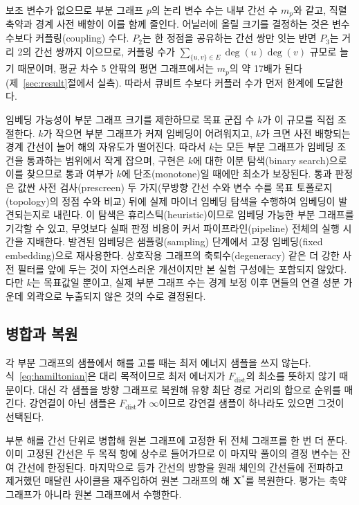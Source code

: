 \documentclass[twocolumn,a4paper]{article}
\begin{document}
보조 변수가 없으므로 부분 그래프 \(p\)의 논리 변수 수는 내부 간선 수 \(m_p\)와 같고, 직렬 축약과 경계 사전 배향이 이를 함께 줄인다. 어닐러에 올릴 크기를 결정하는 것은 변수 수보다 커플링(coupling) 수다. \(P_2\)는 한 정점을 공유하는 간선 쌍만 잇는 반면 \(P_3\)는 거리 2의 간선 쌍까지 이으므로, 커플링 수가 \(\sum_{\{u,v\}\in E}\deg(u)\deg(v)\) 규모로 늘기 때문이며, 평균 차수 5 안팎의 평면 그래프에서는 \(m_p\)의 약 17배가 된다(제~\ref{sec:result}절에서 실측). 따라서 큐비트 수보다 커플러 수가 먼저 한계에 도달한다.

임베딩 가능성이 부분 그래프 크기를 제한하므로 목표 군집 수 \(k\)가 이 규모를 직접 조절한다. \(k\)가 작으면 부분 그래프가 커져 임베딩이 어려워지고, \(k\)가 크면 사전 배향되는 경계 간선이 늘어 해의 자유도가 떨어진다. 따라서 \(k\)는 모든 부분 그래프가 임베딩 조건을 통과하는 범위에서 작게 잡으며, 구현은 \(k\)에 대한 이분 탐색(binary search)으로 이를 찾으므로 통과 여부가 \(k\)에 단조(monotone)일 때에만 최소가 보장된다. 통과 판정은 값싼 사전 검사(prescreen) 두 가지(무방향 간선 수와 변수 수를 목표 토폴로지(topology)의 정점 수와 비교) 뒤에 실제 마이너 임베딩 탐색을 수행하여 임베딩이 발견되는지로 내린다. 이 탐색은 휴리스틱(heuristic)이므로 임베딩 가능한 부분 그래프를 기각할 수 있고, 무엇보다 실패 판정 비용이 커서 파이프라인(pipeline) 전체의 실행 시간을 지배한다. 발견된 임베딩은 샘플링(sampling) 단계에서 고정 임베딩(fixed embedding)으로 재사용한다. 상호작용 그래프의 축퇴수(degeneracy) 같은 더 강한 사전 필터를 앞에 두는 것이 자연스러운 개선이지만 본 실험 구성에는 포함되지 않았다. 다만 \(k\)는 목표값일 뿐이고, 실제 부분 그래프 수는 경계 보정 이후 면들의 연결 성분 가운데 외곽으로 누출되지 않은 것의 수로 결정된다.

\subsection{병합과 복원}

각 부분 그래프의 샘플에서 해를 고를 때는 최저 에너지 샘플을 쓰지 않는다. 식~\eqref{eq:hamiltonian}은 대리 목적이므로 최저 에너지가 \(F_{\mathrm{dist}}\)의 최소를 뜻하지 않기 때문이다. 대신 각 샘플을 방향 그래프로 복원해 유향 최단 경로 거리의 합으로 순위를 매긴다. 강연결이 아닌 샘플은 \(F_{\mathrm{dist}}\)가 \(\infty\)이므로 강연결 샘플이 하나라도 있으면 그것이 선택된다.

부분 해를 간선 단위로 병합해 원본 그래프에 고정한 뒤 전체 그래프를 한 번 더 푼다. 이미 고정된 간선은 두 목적 항에 상수로 들어가므로 이 마지막 풀이의 결정 변수는 잔여 간선에 한정된다. 마지막으로 등가 간선의 방향을 원래 체인의 간선들에 전파하고 제거했던 매달린 사이클을 재주입하여 원본 그래프의 해 \(\mathbf{X}^{*}\)를 복원한다. 평가는 축약 그래프가 아니라 원본 그래프에서 수행한다.
\end{document}
